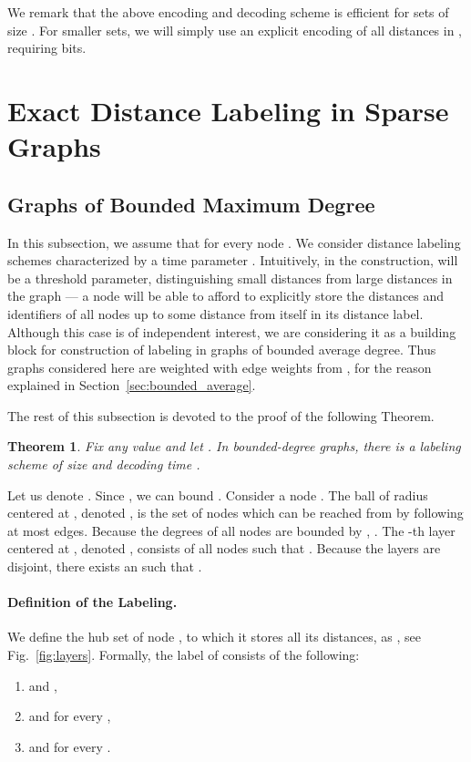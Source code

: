 \documentclass{article}[11pt,letter]
\newtheorem{theorem}[definition]{Theorem}
\begin{document}
We remark that the above encoding and decoding scheme is efficient for sets of size . For smaller sets, we will simply use an explicit encoding of all distances in , requiring  bits.


\section{Exact Distance Labeling in Sparse Graphs}\label{sec:sparse}

\subsection{Graphs of Bounded Maximum Degree}\label{sec:bdg}

In this subsection, we assume that  for every node . We consider distance labeling schemes characterized by a time parameter . Intuitively, in the construction,  will be a threshold parameter, distinguishing small distances from large distances in the graph --- a node will be able to afford to explicitly store the distances and identifiers of all nodes up to some distance  from itself in its distance label. Although this case is of independent interest, we are considering it as a building block for construction of labeling in graphs of bounded average degree. Thus graphs considered here are weighted with edge weights from , for the reason explained in Section~\ref{sec:bounded_average}.

The rest of this subsection is devoted to the proof of the following Theorem.

\begin{theorem}\label{thm:bounded}
Fix any value   and let . In bounded-degree graphs, there is a labeling scheme of size  and decoding time .
\end{theorem}

Let us denote . Since , we can bound .
Consider a node . The ball of radius  centered at , denoted , is the set of nodes
which can be reached from  by following at most  edges. Because the degrees of all nodes
are bounded by , . The -th layer centered at ,
denoted , consists of all nodes  such that . Because
the layers are disjoint, there exists an  such that
.

\paragraph{Definition of the Labeling.} We define the hub set of node , to which it stores all its distances, as , see Fig.~\ref{fig:layers}. Formally, the label of  consists of the following:
\begin{enumerate}
\item  and ,
\item  and  for every ,
\item  and  for every .
\end{enumerate}
\end{document}

